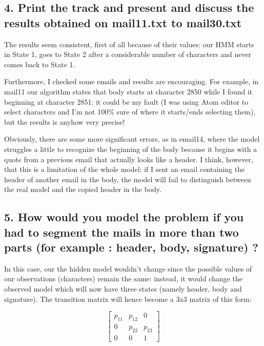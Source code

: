 \documentclass[11pt]{article}
\begin{document}
    \subsection{4. Print the track and present and discuss the results
obtained on mail11.txt to
mail30.txt}\label{print-the-track-and-present-and-discuss-the-results-obtained-on-mail11.txt-to-mail30.txt}

    The results seem consistent, first of all because of their values: our
HMM starts in State 1, goes to State 2 after a considerable number of
characters and never comes back to State 1.

Furthermore, I checked some emails and results are encouraging. For
example, in mail11 our algorithm states that body starts at character
2850 while I found it beginning at character 2851: it could be my fault
(I was using Atom editor to select characters and I'm not 100\% sure of
where it starts/ends selecting them), but the results is anyhow very
precise!

Obviously, there are some more significant errors, as in email14, where
the model struggles a little to recognize the beginning of the body
because it begins with a quote from a previous email that actually looks
like a header. I think, however, that this is a limitation of the whole
model: if I sent an email containing the header of another email in the
body, the model will fail to distinguish between the real model and the
copied header in the body.

    \subsection{5. How would you model the problem if you had to segment the
mails in more than two parts (for example : header, body, signature)
?}\label{how-would-you-model-the-problem-if-you-had-to-segment-the-mails-in-more-than-two-parts-for-example-header-body-signature}

In this case, our the hidden model wouldn't change since the possible
values of our observations (characters) remain the same: instead, it
would change the observed model which will now have three states (namely
header, body and signature). The transition matrix will hence become a
3x3 matrix of this form:

\[ \begin{bmatrix}
    p_{11}       & p_{12} & 0 \\
     0       & p_{22} & p_{23} \\
     0       & 0 & 1
 \end{bmatrix} \]
\end{document}
